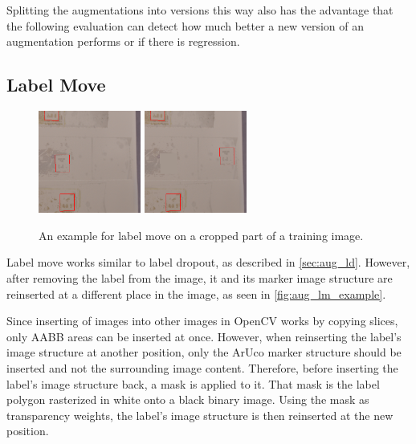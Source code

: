 \documentclass[10pt]{book}
\newcommand{\figureref}[1]{\autoref{#1}}
\begin{document}
Splitting the augmentations into versions this way also has the advantage that the following evaluation can detect how much better a new version of an augmentation performs or if there is regression.

\subsection{Label Move}

\begin{figure}
  \centering
     {\includegraphics[width=0.3\textwidth]{image/aug_lm_before}}
     {\includegraphics[width=0.3\textwidth]{image/aug_lm_after}}
  \caption{An example for label move on a cropped part of a training image.}
  \label{fig:aug_lm_example}
\end{figure}

Label move works similar to label dropout, as described in \autoref{sec:aug_ld}. However, after removing the label from the image, it and its marker image structure are reinserted at a different place in the image, as seen in \figureref{fig:aug_lm_example}. 

Since inserting of images into other images in OpenCV works by copying slices, only \ac{AABB} areas can be inserted at once. However, when reinserting the label's image structure at another position, only the \ac{ArUco} marker structure should be inserted and not the surrounding image content. Therefore, before inserting the label's image structure back, a mask is applied to it. That mask is the label polygon rasterized in white onto a black binary image. Using the mask as transparency weights, the label's image structure is then reinserted at the new position.
\end{document}
